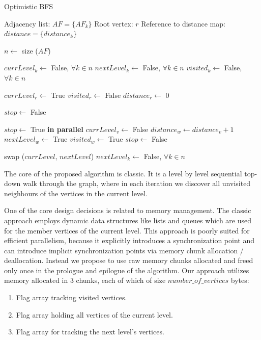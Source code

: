 \documentclass[letterpaper]{article}
\begin{document}
			\begin{algorithm}[ht]
				\caption{Optimistic BFS}
				\label{alg:optbfs}
				\begin{algorithmic}[1]
					\Require
						\Statex Adjacency list: $AF = \lbrace AF_k \rbrace$
						\Statex Root vertex: $r$
						\Statex Reference to distance map: $distance = \lbrace distance_k \rbrace$
					\Statex

					\State $n \gets$ size ($AF$) 					
					
					\State $currLevel_k \gets$ False, $\forall k \in n$
					\State $nextLevel_k \gets$ False, $\forall k \in n$
					\State $visited_k \gets$ False, $\forall k \in n$
					\Statex
					
					\State $currLevel_r \gets$ True
					\State $visited_r \gets$ False
					\State $distance_r \gets$ 0
					\Statex
					
					\State $stop \gets$ False
					\Statex
					
						\State $stop\gets$ True
						 \textbf{in parallel}
								\State $currLevel_v \gets$ False
										\State $distance_w \gets distance_v + 1$
										\State $nextLevel_w \gets$ True
										\State $visited_w \gets$ True
										\State $stop \gets$ False
									\EndIf
								\EndFor
							\EndIf
						\EndFor
						
						\vspace{-0.051cm} %
						
						\State swap ($currLevel$, $nextLevel$)
						\State $nextLevel_k \gets$ False, $\forall k\in n$
					\EndWhile
				\end{algorithmic}
			\end{algorithm}
			
			The core of the proposed algorithm is classic.
			It is a level by level sequential top-down walk through the graph, where in each iteration we discover all unvisited neighbours of the vertices in the current level.
			
			One of the core design decisions is related to memory management.
			The classic approach employs dynamic data structures like lists and queues which are used for the member vertices of the current level.
			This approach is poorly suited for efficient parallelism, because it explicitly introduces a synchronization point and can introduce implicit synchronization points via memory chunk allocation / deallocation. 
			Instead we propose to use raw memory chunks allocated and freed only once in the prologue and epilogue of the algorithm.
			Our approach utilizes memory allocated in 3 chunks, each of which of size $number\_of\_vertices$ bytes:
			\begin{enumerate}
				\item Flag array tracking visited vertices.
				\item Flag array holding all vertices of the current level.
				\item Flag array for tracking the next level's vertices.
			\end{enumerate}
			
\end{document}
